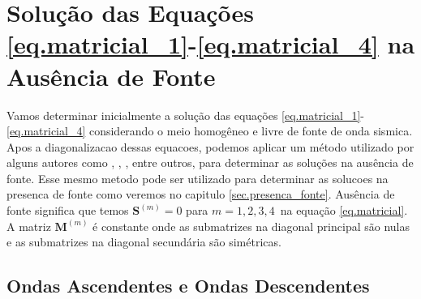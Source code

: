 \chapter{Solu\c{c}\~ao das Equa\c{c}\~oes \ref{eq.matricial_1}-\ref{eq.matricial_4} na Aus\^encia de Fonte}\label{sec.ausencia_fonte}

Vamos determinar inicialmente a solu\c{c}\~ao das equa\c{c}\~oes \ref{eq.matricial_1}-\ref{eq.matricial_4} considerando o meio homog\^eneo e livre de fonte de onda sismica. Apos a diagonalizacao dessas equacoes, podemos aplicar um m\'etodo utilizado por alguns autores como \cite{Ursin-1983}, \cite{Azeredo_2013}, \cite{White_Zhou_2006}, \cite{miranda_2016} entre outros, para determinar as solu\c{c}\~oes na aus\^encia de fonte. Esse mesmo metodo pode ser utilizado para determinar as solucoes na presenca de fonte como veremos no capitulo \ref{sec.presenca_fonte}. Aus\^encia de fonte significa que temos $\mathbf{S}^{(m)}=0$ para $m=1,2,3,4\,$ na equa\c{c}\~ao \ref{eq.matricial}. A matriz $\mathbf{M}^{(m)}$ \'e constante onde as submatrizes na diagonal principal s\~ao nulas e as submatrizes na diagonal secund\'aria s\~ao sim\'etricas. 



\section{Ondas Ascendentes e Ondas Descendentes}

